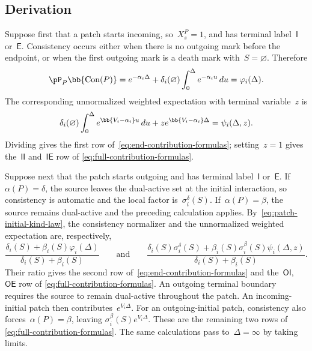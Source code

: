 \subsection{Derivation}
\label{app:contribution-derivation}

Suppose first that a patch starts incoming, so~$X_s^P=1$, and has terminal
label~$\mathsf I$ or~$\mathsf E$. Consistency occurs either when there is no
outgoing mark before the endpoint, or when the first outgoing mark is a death
mark with~$S=\varnothing$. Therefore
\begin{equation*}
\pP_P\bb{\operatorname{Con}(P)}
=
e^{-\alpha_i\Delta}
+
\delta_i(\varnothing)
\int_0^\Delta e^{-\alpha_i u}\,du
=
\varphi_i(\Delta).
\end{equation*}
The corresponding unnormalized weighted expectation with terminal variable~$z$
is
\begin{equation*}
\delta_i(\varnothing)
\int_0^\Delta e^{\bb{V_i-\alpha_i}u}\,du
+
z e^{\bb{V_i-\alpha_i}\Delta}
=
\psi_i(\Delta,z).
\end{equation*}
Dividing gives the first row of~\eqref{eq:end-contribution-formulas};
setting~$z=1$ gives the~$\mathsf{II}$ and~$\mathsf{IE}$ row of
\eqref{eq:full-contribution-formulas}.

Suppose next that the patch starts outgoing and has terminal label~$\mathsf I$
or~$\mathsf E$. If~$\alpha(P)=\delta$, the source leaves the dual-active set at
the initial interaction, so consistency is automatic and the local factor
is~$\sigma_i^\delta(S)$. If~$\alpha(P)=\beta$, the source remains dual-active
and the preceding calculation applies. By~\eqref{eq:patch-initial-kind-law},
the consistency normalizer and the unnormalized weighted expectation are,
respectively,
\begin{equation*}
\frac{
\delta_i(S)+\beta_i(S)\varphi_i(\Delta)
}{
\delta_i(S)+\beta_i(S)
}
\qquad\text{and}\qquad
\frac{
\delta_i(S)\sigma_i^\delta(S)
+
\beta_i(S)\sigma_i^\beta(S)\psi_i(\Delta,z)
}{
\delta_i(S)+\beta_i(S)
}.
\end{equation*}
Their ratio gives the second row of~\eqref{eq:end-contribution-formulas} and
the~$\mathsf{OI}$,~$\mathsf{OE}$ row of
\eqref{eq:full-contribution-formulas}. An outgoing terminal boundary requires
the source to remain dual-active throughout the patch. An incoming-initial
patch then contributes~$e^{V_i\Delta}$. For an outgoing-initial patch,
consistency also forces~$\alpha(P)=\beta$, leaving
$\sigma_i^\beta(S)e^{V_i\Delta}$. These are the remaining two rows of
\eqref{eq:full-contribution-formulas}. The same calculations pass
to~$\Delta=\infty$ by taking limits.

